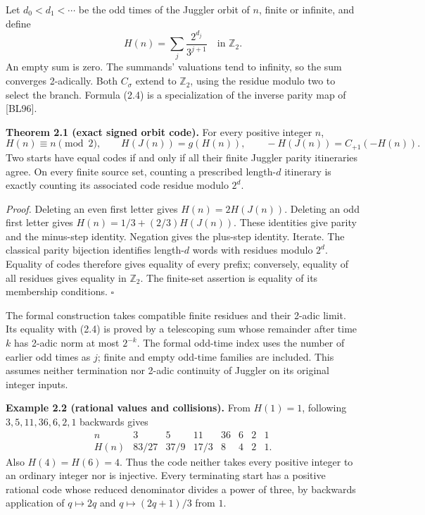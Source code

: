 \documentclass[11pt,a4paper]{article}
\begin{document}
Let \(d_0<d_1<\cdots\) be the odd times of the Juggler orbit of \(n\),
finite or infinite, and define \[
H(n)=\sum_j\frac{2^{d_j}}{3^{j+1}}\quad\text{in }\mathbb Z_2.
\tag{2.4}
\] An empty sum is zero. The summands' valuations tend to infinity, so
the sum converges 2-adically. Both \(C_\sigma\) extend to
\(\mathbb Z_2\), using the residue modulo two to select the branch.
Formula (2.4) is a specialization of the inverse parity map of
{[}BL96{]}.

\textbf{Theorem 2.1 (exact signed orbit code).} For every positive
integer \(n\), \[
H(n)\equiv n\pmod2,\qquad
H(J(n))=g(H(n)),\qquad
-H(J(n))=C_{+1}(-H(n)).
\tag{2.5}
\] Two starts have equal codes if and only if all their finite Juggler
parity itineraries agree. On every finite source set, counting a
prescribed length-\(d\) itinerary is exactly counting its associated
code residue modulo \(2^d\).

\emph{Proof.} Deleting an even first letter gives \(H(n)=2H(J(n))\).
Deleting an odd first letter gives \(H(n)=1/3+(2/3)H(J(n))\). These
identities give parity and the minus-step identity. Negation gives the
plus-step identity. Iterate. The classical parity bijection identifies
length-\(d\) words with residues modulo \(2^d\). Equality of codes
therefore gives equality of every prefix; conversely, equality of all
residues gives equality in \(\mathbb Z_2\). The finite-set assertion is
equality of its membership conditions. \(\square\)

The formal construction takes compatible finite residues and their
2-adic limit. Its equality with (2.4) is proved by a telescoping sum
whose remainder after time \(k\) has 2-adic norm at most \(2^{-k}\). The
formal odd-time index uses the number of earlier odd times as \(j\);
finite and empty odd-time families are included. This assumes neither
termination nor 2-adic continuity of Juggler on its original integer
inputs.

\textbf{Example 2.2 (rational values and collisions).} From \(H(1)=1\),
following \(3,5,11,36,6,2,1\) backwards gives \[
\begin{array}{c|rrrrrrr}
n&3&5&11&36&6&2&1\\ \hline
H(n)&83/27&37/9&17/3&8&4&2&1.
\end{array}
\] Also \(H(4)=H(6)=4\). Thus the code neither takes every positive
integer to an ordinary integer nor is injective. Every terminating start
has a positive rational code whose reduced denominator divides a power
of three, by backwards application of \(q\mapsto2q\) and
\(q\mapsto(2q+1)/3\) from \(1\).
\end{document}
